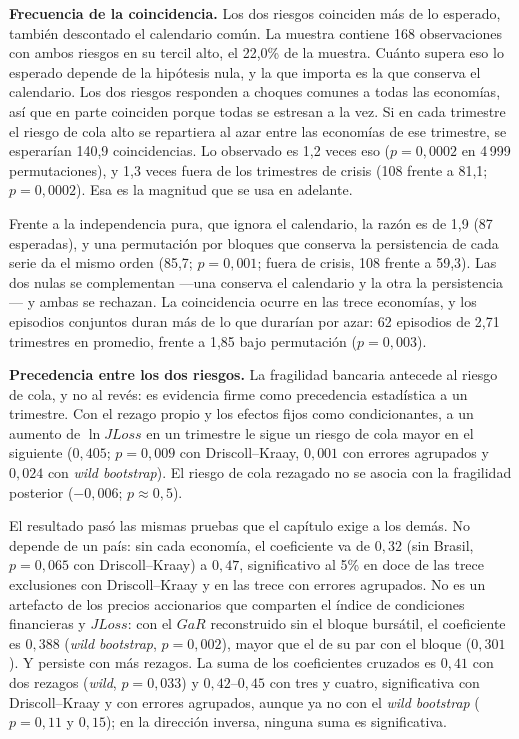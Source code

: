 \textbf{Frecuencia de la coincidencia.} Los dos riesgos coinciden más de lo esperado, también descontado el calendario común. La muestra contiene 168 observaciones con ambos riesgos en su tercil alto, el 22,0\% de la muestra. Cuánto supera eso lo esperado depende de la hipótesis nula, y la que importa es la que conserva el calendario. Los dos riesgos responden a choques comunes a todas las economías, así que en parte coinciden porque todas se estresan a la vez. Si en cada trimestre el riesgo de cola alto se repartiera al azar entre las economías de ese trimestre, se esperarían 140,9 coincidencias. Lo observado es 1,2 veces eso ($p=0{,}0002$ en 4\,999 permutaciones), y 1,3 veces fuera de los trimestres de crisis (108 frente a 81,1; $p=0{,}0002$). Esa es la magnitud que se usa en adelante.

Frente a la independencia pura, que ignora el calendario, la razón es de 1,9 (87 esperadas), y una permutación por bloques que conserva la persistencia de cada serie da el mismo orden (85,7; $p=0{,}001$; fuera de crisis, 108 frente a 59,3). Las dos nulas se complementan ---una conserva el calendario y la otra la persistencia--- y ambas se rechazan. La coincidencia ocurre en las trece economías, y los episodios conjuntos duran más de lo que durarían por azar: 62 episodios de 2,71 trimestres en promedio, frente a 1,85 bajo permutación ($p=0{,}003$).

\textbf{Precedencia entre los dos riesgos.} La fragilidad bancaria antecede al riesgo de cola, y no al revés: es evidencia firme como precedencia estadística a un trimestre. Con el rezago propio y los efectos fijos como condicionantes, a un aumento de $\ln JLoss$ en un trimestre le sigue un riesgo de cola mayor en el siguiente ($0{,}405$; $p=0{,}009$ con Driscoll--Kraay, $0{,}001$ con errores agrupados y $0{,}024$ con \textit{wild bootstrap}). El riesgo de cola rezagado no se asocia con la fragilidad posterior ($-0{,}006$; $p\approx0{,}5$).

El resultado pasó las mismas pruebas que el capítulo exige a los demás. No depende de un país: sin cada economía, el coeficiente va de $0{,}32$ (sin Brasil, $p=0{,}065$ con Driscoll--Kraay) a $0{,}47$, significativo al 5\% en doce de las trece exclusiones con Driscoll--Kraay y en las trece con errores agrupados. No es un artefacto de los precios accionarios que comparten el índice de condiciones financieras y $JLoss$: con el $GaR$ reconstruido sin el bloque bursátil, el coeficiente es $0{,}388$ (\textit{wild bootstrap}, $p=0{,}002$), mayor que el de su par con el bloque ($0{,}301$). Y persiste con más rezagos. La suma de los coeficientes cruzados es $0{,}41$ con dos rezagos (\textit{wild}, $p=0{,}033$) y $0{,}42$--$0{,}45$ con tres y cuatro, significativa con Driscoll--Kraay y con errores agrupados, aunque ya no con el \textit{wild bootstrap} ($p=0{,}11$ y $0{,}15$); en la dirección inversa, ninguna suma es significativa.

